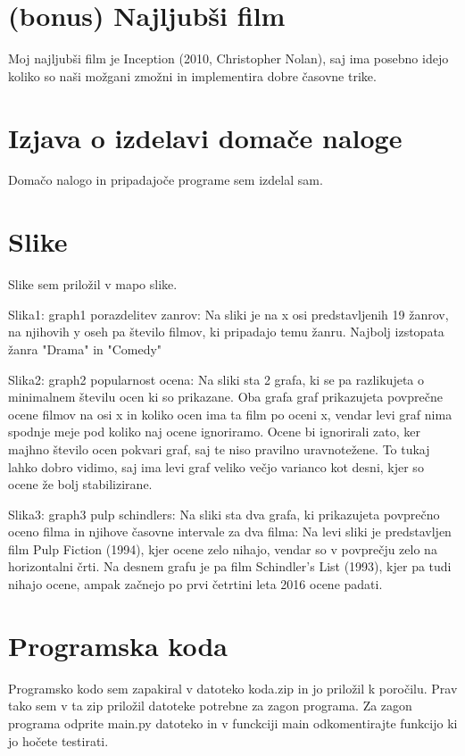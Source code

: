 \documentclass[a4paper,11pt]{article}
\begin{document}
	\section{(bonus) Najljubši film}
	Moj najljubši film je Inception (2010, Christopher Nolan), saj ima posebno idejo koliko so naši možgani zmožni in implementira dobre časovne trike.
	

	\section{Izjava o izdelavi domače naloge}
	Domačo nalogo in pripadajoče programe sem izdelal sam.
	
	\appendix
	\appendixpage
	\section{\label{app-res}Slike}
	Slike sem priložil v mapo slike.
	
	Slika1: graph1 porazdelitev zanrov:
		Na sliki je na x osi predstavljenih 19 žanrov, na njihovih y oseh pa število filmov, ki pripadajo temu žanru. Najbolj izstopata žanra "Drama" in "Comedy"
		
	Slika2: graph2 popularnost ocena:
		Na sliki sta 2 grafa, ki se pa razlikujeta o minimalnem številu ocen ki so prikazane.
		Oba grafa graf prikazujeta povprečne ocene filmov na osi x in koliko ocen ima ta film po oceni x, vendar levi graf nima spodnje meje pod koliko naj ocene ignoriramo.
		Ocene bi ignorirali zato, ker majhno število ocen pokvari graf, saj te niso pravilno uravnotežene. To tukaj lahko dobro vidimo, saj ima levi graf veliko večjo varianco kot desni, kjer so ocene že bolj stabilizirane.
		
	Slika3: graph3 pulp schindlers:
		Na sliki sta dva grafa, ki prikazujeta povprečno oceno filma in njihove časovne intervale za dva filma:
		Na levi sliki je predstavljen film Pulp Fiction (1994), kjer ocene zelo nihajo, vendar so v povprečju zelo na horizontalni črti. Na desnem grafu je pa film Schindler's List (1993), kjer pa tudi nihajo ocene, ampak začnejo po prvi četrtini leta 2016 ocene padati.
		
	
		
	\section{\label{app-code}Programska koda}
	Programsko kodo sem zapakiral v datoteko koda.zip in jo priložil k poročilu.
	Prav tako sem v ta zip priložil datoteke potrebne za zagon programa.
	Za zagon programa odprite main.py datoteko in v funckciji main odkomentirajte funkcijo ki jo hočete testirati.

	
\end{document}
